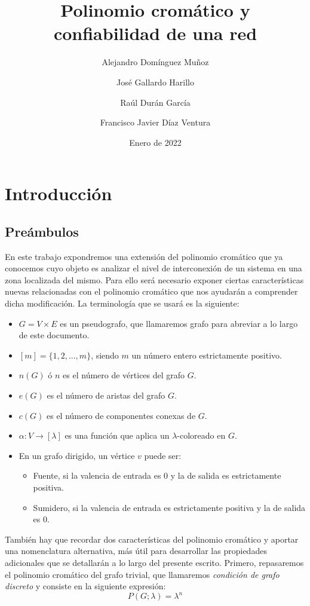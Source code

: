 \documentclass{article}
\title{Polinomio cromático y confiabilidad de una red}
\author{
    Alejandro Domínguez Muñoz
    \and
    José Gallardo Harillo
    \and
    Raúl Durán García
    \and
    Francisco Javier Díaz Ventura
}
\date{Enero de 2022}
\numberwithin{figure}{section}
\begin{document}
\maketitle

\tableofcontents

\section{Introducción}

\subsection{Preámbulos}

En este trabajo expondremos una extensión del polinomio cromático que ya conocemos cuyo objeto es analizar el nivel de interconexión de un sistema en una zona localizada del mismo. Para ello será necesario exponer ciertas características nuevas relacionadas con el polinomio cromático que nos ayudarán a comprender dicha modificación. La terminología que se usará es la siguiente:

\begin{itemize}
    \item $G = V \times E$ es un pseudografo, que llamaremos grafo para abreviar a lo largo de este documento.
    \item $[m] = \{1,2,...,m\}$, siendo $m$ un número entero estrictamente positivo.
    \item $n(G)$ ó $n$ es el número de vértices del grafo $G$.
    \item $e(G)$ es el número de aristas del grafo $G$.
    \item $c(G)$ es el número de componentes conexas de $G$.
    \item $\alpha : V \to [\lambda]$ es una función que aplica un $\lambda$-coloreado en $G$.
    \item En un grafo dirigido, un vértice $v$ puede ser:
    \begin{itemize}
        \item Fuente, si la valencia de entrada es 0 y la de salida es estrictamente positiva.
        \item Sumidero, si la valencia de entrada es estrictamente positiva y la de salida es 0.
    \end{itemize}
\end{itemize}

También hay que recordar dos características del polinomio cromático y aportar una nomenclatura alternativa, más útil para desarrollar las propiedades adicionales que se detallarán a lo largo del presente escrito. Primero, repasaremos el polinomio cromático del grafo trivial, que llamaremos \emph{condición de grafo discreto} y consiste en la siguiente expresión:
\begin{equation*}
    P(G; \lambda) = \lambda^n
\end{equation*}
\end{document}
